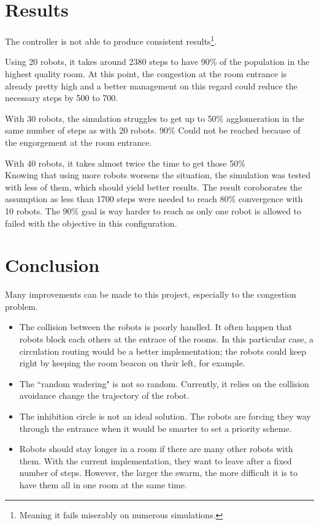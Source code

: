 \documentclass[11pt, a4paper]{article}
\begin{document}
\section{Results}
The controller is not able to produce consistent results\footnote{Meaning it fails miserably on numerous simulations.}.

Using 20 robots, it takes around 2380 steps to have 90\% of the population in the highest quality room.
At this point, the congestion at the room entrance is already pretty high and a better management on this regard could reduce the necessary steps by 500 to 700.

With 30 robots, the simulation struggles to get up to 50\% agglomeration in the same number of steps as with 20 robots.
90\% Could not be reached because of the engorgement at the room entrance.

With 40 robots, it takes almost twice the time to get those 50\%
~\\

Knowing that using more robots worsens the situation, the simulation was tested with less of them, which should yield better results.
The result coroborates the assumption as less than 1700 steps were needed to reach 80\% convergence with 10 robots.
The 90\% goal is way harder to reach as only one robot is allowed to failed with the objective in this configuration.

\section{Conclusion}
Many improvements can be made to this project, especially to the congestion problem.

\begin{itemize}
	\item The collision between the robots is poorly handled.
	It often happen that robots block each others at the entrace of the rooms.
	In this particular case, a circulation routing would be a better implementation; the robots could keep right by keeping the room beacon on their left, for example.
	\item The ``random wadering" is not so random. Currently, it relies on the collision avoidance change the trajectory of the robot.
	\item The inhibition circle is not an ideal solution. The robots are forcing they way through the entrance when it would be smarter to set a priority scheme.
	\item Robots should stay longer in a room if there are many other robots with them. With the current implementation, they want to leave after a fixed number of steps. However, the larger the swarm, the more difficult it is to have them all in one room at the same time.
\end{itemize}
\end{document}
